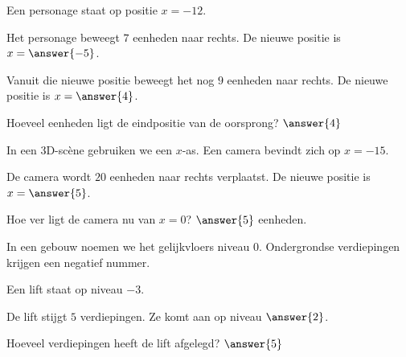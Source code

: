 \documentclass{ximera}
\begin{document}
    
    
    \begin{oefening}{\oefB\ESS}
    
    Een personage staat op positie \(x=-12\).
    
    \begin{question}
    Het personage beweegt \(7\) eenheden naar rechts.
    De nieuwe positie is \(x=\answer{-5}\).
    \end{question}
    
    \begin{question}
    Vanuit die nieuwe positie beweegt het nog \(9\) eenheden naar rechts.
    De nieuwe positie is \(x=\answer{4}\).
    \end{question}
    
    \begin{question}
    Hoeveel eenheden ligt de eindpositie van de oorsprong?
    \(\answer{4}\)
    \end{question}
    
    \end{oefening}
    
    
    \begin{oefening}{\oefB}
    
    In een 3D-scène gebruiken we een \(x\)-as.
    Een camera bevindt zich op \(x=-15\).
    
    \begin{question}
    De camera wordt \(20\) eenheden naar rechts verplaatst.
    De nieuwe positie is \(x=\answer{5}\).
    \end{question}
    
    \begin{question}
    Hoe ver ligt de camera nu van \(x=0\)?
    \(\answer{5}\) eenheden.
    \end{question}
    
    \end{oefening}
    
    
    \begin{oefening}[Verdiepingen]{\oefB}
    
    In een gebouw noemen we het gelijkvloers niveau \(0\).
    Ondergrondse verdiepingen krijgen een negatief nummer.
    
    Een lift staat op niveau \(-3\).
    
    \begin{question}
    De lift stijgt \(5\) verdiepingen.
    Ze komt aan op niveau \(\answer{2}\).
    \end{question}
    
    \begin{question}
    Hoeveel verdiepingen heeft de lift afgelegd?
    \(\answer{5}\)
    \end{question}
    
    \end{oefening}
    
\end{document}
